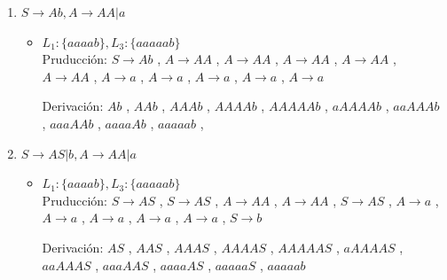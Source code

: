 \documentclass{article}
\begin{document}
\begin{enumerate}
\begin{itemize}
                \end{itemize}
                
            \item $S \to Ab, A \to AA|a$
            
                \begin{itemize}
                    \item $ L_1 : \{aaaab\},  L_3 : \{aaaaab\}$ \\
                        Pruducción: 
                        $ S \to Ab $ ,
                        $ A \to AA $ ,
                        $ A \to AA $ ,
                        $ A \to AA $ ,
                        $ A \to AA $ ,
                        $ A \to AA $ ,
                        $ A \to a $ ,
                        $ A \to a $ ,
                        $ A \to a $ ,
                        $ A \to a $ ,
                        $ A \to a $
                        
                        Derivación:
                        $ Ab $ ,
                        $ AAb $ ,
                        $ AAAb $ ,
                        $ AAAAb $ ,
                        $ AAAAAb $ ,
                        $ aAAAAb $ ,
                        $ aaAAAb $ ,
                        $ aaaAAb $ ,
                        $ aaaaAb $ ,
                        $ aaaaab $ ,
               \end{itemize}
               
            \item $S \to AS|b, A \to AA|a$
            
                \begin{itemize}
                    \item $ L_1 : \{aaaab\},  L_3 : \{aaaaab\}$ \\
                        Pruducción: 
                        $ S \to AS $ ,
                        $ S \to AS $ ,
                        $ A \to AA $ ,
                        $ A \to AA $ ,
                        $ S \to AS $ ,
                        $ A \to a $ ,
                        $ A \to a $ ,
                        $ A \to a $ ,
                        $ A \to a $ ,
                        $ A \to a $ ,
                        $ S \to b $
                        
                        Derivación:
                        $ AS $ ,
                        $ AAS $ ,
                        $ AAAS $ ,
                        $ AAAAS $ ,
                        $ AAAAAS $ ,
                        $ aAAAAS $ ,
                        $ aaAAAS $ ,
                        $ aaaAAS $ ,
                        $ aaaaAS $ ,
                        $ aaaaaS $ ,
                        $ aaaaab $ 
                        

\end{itemize}
\end{enumerate}
\end{document}
